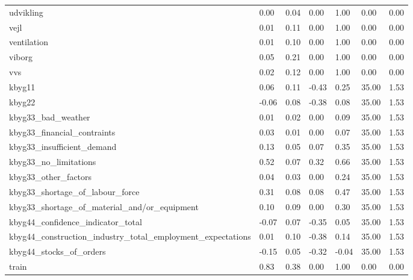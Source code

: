 \begin{landscape}
\begin{longtable}[h!]{lllllll}
udvikling & 0.00 & 0.04 & 0.00 & 1.00 & 0.00 & 0.00 \\
vejl & 0.01 & 0.11 & 0.00 & 1.00 & 0.00 & 0.00 \\
ventilation & 0.01 & 0.10 & 0.00 & 1.00 & 0.00 & 0.00 \\
viborg & 0.05 & 0.21 & 0.00 & 1.00 & 0.00 & 0.00 \\
vvs & 0.02 & 0.12 & 0.00 & 1.00 & 0.00 & 0.00 \\
kbyg11 & 0.06 & 0.11 & -0.43 & 0.25 & 35.00 & 1.53 \\
kbyg22 & -0.06 & 0.08 & -0.38 & 0.08 & 35.00 & 1.53 \\
kbyg33_bad_weather & 0.01 & 0.02 & 0.00 & 0.09 & 35.00 & 1.53 \\
kbyg33_financial_contraints & 0.03 & 0.01 & 0.00 & 0.07 & 35.00 & 1.53 \\
kbyg33_insufficient_demand & 0.13 & 0.05 & 0.07 & 0.35 & 35.00 & 1.53 \\
kbyg33_no_limitations & 0.52 & 0.07 & 0.32 & 0.66 & 35.00 & 1.53 \\
kbyg33_other_factors & 0.04 & 0.03 & 0.00 & 0.24 & 35.00 & 1.53 \\
kbyg33_shortage_of_labour_force & 0.31 & 0.08 & 0.08 & 0.47 & 35.00 & 1.53 \\
kbyg33_shortage_of_material_and/or_equipment & 0.10 & 0.09 & 0.00 & 0.30 & 35.00 & 1.53 \\
kbyg44_confidence_indicator_total & -0.07 & 0.07 & -0.35 & 0.05 & 35.00 & 1.53 \\
kbyg44_construction_industry_total_employment_expectations & 0.01 & 0.10 & -0.38 & 0.14 & 35.00 & 1.53 \\
kbyg44_stocks_of_orders & -0.15 & 0.05 & -0.32 & -0.04 & 35.00 & 1.53 \\
train & 0.83 & 0.38 & 0.00 & 1.00 & 0.00 & 0.00 \\
\end{longtable}\end{landscape}
